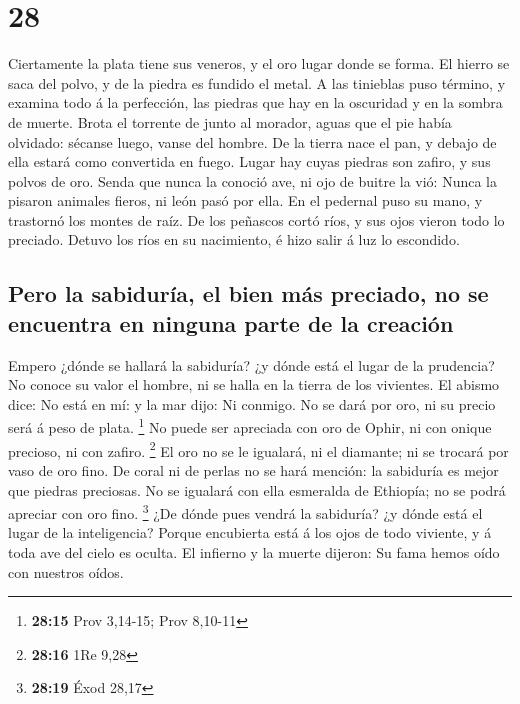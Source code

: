 \hypertarget{section-27}{%
\section{28}\label{section-27}}

 Ciertamente la plata tiene sus veneros, y el oro lugar
donde se forma.  El hierro se saca del polvo, y de la
piedra es fundido el metal.  A las tinieblas puso término,
y examina todo á la perfección, las piedras que hay en la oscuridad y en
la sombra de muerte.  Brota el torrente de junto al
morador, aguas que el pie había olvidado: sécanse luego, vanse del
hombre.  De la tierra nace el pan, y debajo de ella estará
como convertida en fuego.  Lugar hay cuyas piedras son
zafiro, y sus polvos de oro.  Senda que nunca la conoció
ave, ni ojo de buitre la vió:  Nunca la pisaron animales
fieros, ni león pasó por ella.  En el pedernal puso su
mano, y trastornó los montes de raíz.  De los peñascos
cortó ríos, y sus ojos vieron todo lo preciado.  Detuvo
los ríos en su nacimiento, é hizo salir á luz lo escondido.

\hypertarget{pero-la-sabiduruxeda-el-bien-muxe1s-preciado-no-se-encuentra-en-ninguna-parte-de-la-creaciuxf3n}{%
\subsection{Pero la sabiduría, el bien más preciado, no se encuentra en
ninguna parte de la
creación}\label{pero-la-sabiduruxeda-el-bien-muxe1s-preciado-no-se-encuentra-en-ninguna-parte-de-la-creaciuxf3n}}

 Empero ¿dónde se hallará la sabiduría? ¿y dónde está el
lugar de la prudencia?  No conoce su valor el hombre, ni
se halla en la tierra de los vivientes.  El abismo dice:
No está en mí: y la mar dijo: Ni conmigo.  No se dará por
oro, ni su precio será á peso de plata. \footnote{\textbf{28:15} Prov
  3,14-15; Prov 8,10-11}  No puede ser apreciada con oro
de Ophir, ni con onique precioso, ni con zafiro. \footnote{\textbf{28:16}
  1Re 9,28}  El oro no se le igualará, ni el diamante; ni
se trocará por vaso de oro fino.  De coral ni de perlas
no se hará mención: la sabiduría es mejor que piedras preciosas.
 No se igualará con ella esmeralda de Ethiopía; no se
podrá apreciar con oro fino. \footnote{\textbf{28:19} Éxod 28,17}
 ¿De dónde pues vendrá la sabiduría? ¿y dónde está el
lugar de la inteligencia?  Porque encubierta está á los
ojos de todo viviente, y á toda ave del cielo es oculta. 
El infierno y la muerte dijeron: Su fama hemos oído con nuestros oídos.

